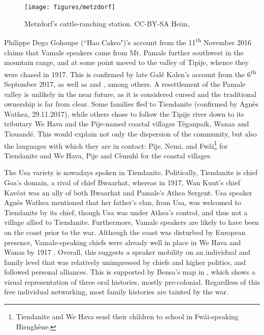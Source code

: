 \begin{figure}
	\texttt{[image: figures/metzdorf]}
	\label{fig:metzdorf}
	\caption{Metzdorf's cattle-ranching station. CC-BY-SA Heim, \parencite{heim_farm_1921}}
\end{figure}


Philippe Dego Gohoupe (``Hao Cakeo")'s account from the 11\textsuperscript{th} November 2016 claims that Vamale speakers came from Mt. Pamale further southwest in the mountain range, and at some point moved to the valley of Tipije, whence they were chased in 1917. This is confirmed by late Galé Kalen's account from the 6\textsuperscript{th} September 2017, as well as \textcite{bensa_political_1997} and \textcite{leenhardt_figures_1978}, among others. A resettlement of the Pamale valley is unlikely in the near future, as it is considered cursed and the traditional ownership is far from clear. Some families fled to Tiendanite (confirmed by Agnès Wathea, 29.11.2017), while others chose to follow the Tipije river down to its tributary We Hava and the Pije-named coastal villages Téganpaïk, Wanaa and Tiouandé. This would explain not only the dispersion of the community, but also the languages with which they are in contact: Pije, Nemi, and Fwâi\footnote{Tiendanite and We Hava send their children to school in Fwâi-speaking Hienghène.} for Tiendanite and We Hava, Pije and Cèmuhî for the coastal villages.

The Usa variety is nowadays spoken in Tiendanite. Politically, Tiendanite is chief Goa's domain, a rival of chief Bwaarhat, whereas in 1917, Wan Kuut's chief Kavéat was an ally of both Bwaarhat and Pamale's Athea Sergent. Usa speaker Agnès Wathea mentioned that her father's clan, from Usa, was welcomed to Tiendanite by its chief, though Usa was under Athea's control, and thus not a village allied to Tiendanite. Furthermore, Vamale speakers are likely to have been on the coast prior to the war. Although the coast was disturbed by European presence, Vamale-speaking chiefs were already well in place in We Hava and Wanas by 1917 \parencite[20]{leenhardt_evenements_1978a}. Overall, this suggests a speaker mobility on an individual and family level that was relatively unimpressed by chiefs and higher politics, and followed personal alliances. This is supported by Bensa's map in , which shows a visual representation of three oral histories, mostly pre-colonial. Regardless of this free individual networking, most family histories are tainted by the war.%

